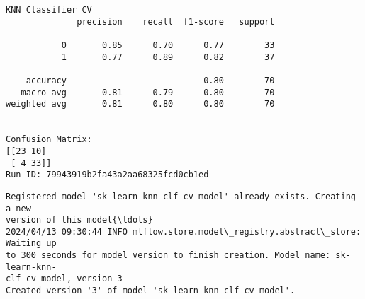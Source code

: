 \documentclass[11pt]{article}
\begin{document}
    \begin{Verbatim}[commandchars=\\\{\}]
KNN Classifier CV
              precision    recall  f1-score   support

           0       0.85      0.70      0.77        33
           1       0.77      0.89      0.82        37

    accuracy                           0.80        70
   macro avg       0.81      0.79      0.80        70
weighted avg       0.81      0.80      0.80        70


Confusion Matrix:
[[23 10]
 [ 4 33]]
Run ID: 79943919b2fa43a2aa68325fcd0cb1ed
    \end{Verbatim}

    \begin{Verbatim}[commandchars=\\\{\}]
Registered model 'sk-learn-knn-clf-cv-model' already exists. Creating a new
version of this model{\ldots}
2024/04/13 09:30:44 INFO mlflow.store.model\_registry.abstract\_store: Waiting up
to 300 seconds for model version to finish creation. Model name: sk-learn-knn-
clf-cv-model, version 3
Created version '3' of model 'sk-learn-knn-clf-cv-model'.
    \end{Verbatim}
\end{document}

